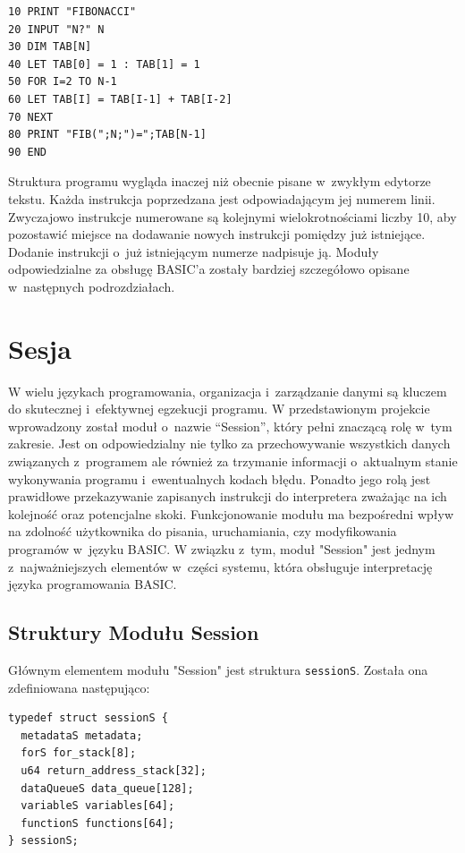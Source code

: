 \documentclass[shortabstract]{iithesis}
\begin{document}
\begin{verbatim}
10 PRINT "FIBONACCI"
20 INPUT "N?" N
30 DIM TAB[N]
40 LET TAB[0] = 1 : TAB[1] = 1
50 FOR I=2 TO N-1
60 LET TAB[I] = TAB[I-1] + TAB[I-2]
70 NEXT
80 PRINT "FIB(";N;")=";TAB[N-1]
90 END
\end{verbatim}
Struktura programu wygląda inaczej niż obecnie pisane w~zwykłym edytorze tekstu. Każda instrukcja poprzedzana jest odpowiadającym jej numerem linii. Zwyczajowo instrukcje numerowane są kolejnymi wielokrotnościami liczby 10, aby pozostawić miejsce na dodawanie nowych instrukcji pomiędzy już istniejące. Dodanie instrukcji o~już istniejącym numerze nadpisuje ją. Moduły odpowiedzialne za obsługę BASIC'a zostały bardziej szczegółowo opisane w~następnych podrozdziałach.

\section{Sesja}
W wielu językach programowania, organizacja i~zarządzanie danymi są kluczem do skutecznej i~efektywnej egzekucji programu. W przedstawionym projekcie wprowadzony został moduł o~nazwie “Session”, który pełni znaczącą rolę w~tym zakresie. Jest on odpowiedzialny nie tylko za przechowywanie wszystkich danych związanych z~programem ale również za trzymanie informacji o~aktualnym stanie wykonywania programu i~ewentualnych kodach błędu. Ponadto jego rolą jest prawidłowe przekazywanie zapisanych instrukcji do interpretera zważając na ich kolejność oraz potencjalne skoki. Funkcjonowanie modułu ma bezpośredni wpływ na zdolność użytkownika do pisania, uruchamiania, czy modyfikowania programów w~języku BASIC. W związku z~tym, moduł "Session" jest jednym z~najważniejszych elementów w~części systemu, która obsługuje interpretację języka programowania BASIC.
\subsection{Struktury Modułu Session}
Głównym elementem modułu "Session" jest struktura \texttt{sessionS}. Została ona zdefiniowana następująco:
\begin{verbatim}
typedef struct sessionS {
  metadataS metadata;
  forS for_stack[8];
  u64 return_address_stack[32];
  dataQueueS data_queue[128];
  variableS variables[64];
  functionS functions[64];
} sessionS;
\end{verbatim}
\end{document}
